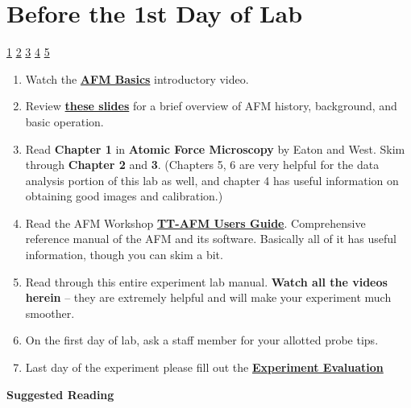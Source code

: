 \documentclass{../lab}
\newcommand{\afmuserguide}{\href{https://berkeley-physics111b.github.io/assets/pdf/oldwebsitestructure/AFMImages/TT_AFM\%20User-Guide-V2.2-600DPI.pdf}{\textbf{TT-AFM Users Guide}}}
\begin{document}
\section{Before the 1st Day of Lab }

\signatures  \hyperlink{Alignments}{ 1}  \hyperlink{Pre-Scan Settings}{ 2} \hyperlink{Calibration}{ 3} \hyperlink{CD/DVD}{ 4} \hyperlink{Boltzmann's Constant}{ 5}

\begin{enumerate}
    \item Watch the \href{https://berkeley-physics111b.github.io/assets/pdf/oldwebsitestructure/Introduction\%20Video.mp4}{\textbf{AFM Basics}} introductory video.

    \item Review \href{https://berkeley-physics111b.github.io/assets/pdf/oldwebsitestructure/AFMImages/Lecture\_10\_AFM.pdf}{\textbf{these slides}} for a brief overview of AFM history, background, and basic operation.

    \item Read \textbf{Chapter 1} in \textbf{Atomic Force Microscopy} by Eaton and West. Skim through \textbf{Chapter 2} and \textbf{3}. (Chapters 5, 6 are very helpful for the data analysis portion of this lab as well, and chapter 4 has useful information on obtaining good images and calibration.)

    \item Read the AFM Workshop \afmuserguide. Comprehensive reference manual of the AFM and its software. Basically all of it has useful information, though you can skim a bit.

    \item Read through this entire experiment lab manual. \textbf{Watch all the videos herein} -- they are extremely helpful and will make your experiment much smoother.
    
    \item On the first day of lab, ask a staff member for your allotted probe tips.
    
    \item Last day of the experiment please fill out the \href{\ExperimentEvaluation}{\textbf{Experiment Evaluation}}

\end{enumerate}

\textbf{Suggested Reading}
\end{document}
